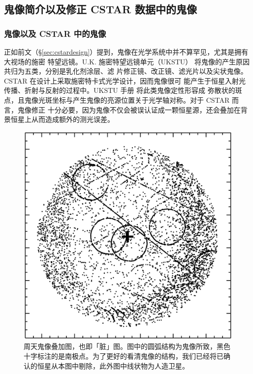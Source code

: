 \subsection{鬼像简介以及修正 CSTAR 数据中的鬼像} \label{sec:ghost}

\subsubsection{鬼像以及 CSTAR 中的鬼像}
正如前文（\S \ref{sec:cstardesign}）提到，鬼像在光学系统中并不算罕见，尤其是拥有大视场的施密
特望远镜。U.K. 施密特望远镜单元（UKSTU） 将鬼像的产生原因共归为五类，分别是乳化剂涂层、滤
片修正镜、改正镜、滤光片以及尖状鬼像。CSTAR 在设计上采取施密特卡式光学设计，因而鬼像很可
能产生于恒星入射光传播、折射与反射的过程中。UKSTU 手册\cite{1983ukstu} 将此类鬼像定性形容成
弥散状的斑点，且鬼像光斑坐标与产生鬼像的亮源位置关于光学轴对称。对于 CSTAR 而言，鬼像修正
十分必要，因为鬼像不仅会被误认证成一颗恒星源，还会叠加在背景恒星上从而造成额外的测光误差。

\begin{figure}[t]
\centering
\includegraphics[width=1.0\textwidth]{figures/chapter2/f3_ghoststack.eps}
\caption{周天鬼像叠加图，也即「脏」图。图中的圆弧结构为鬼像所致，黑色十字标注的是南极点。为了更好的看清鬼像的结构，我们已经将已确认的恒星从本图中剔除，此外图中线状物为人造卫星。}
\label{fig:ghoststack}
\end{figure}

